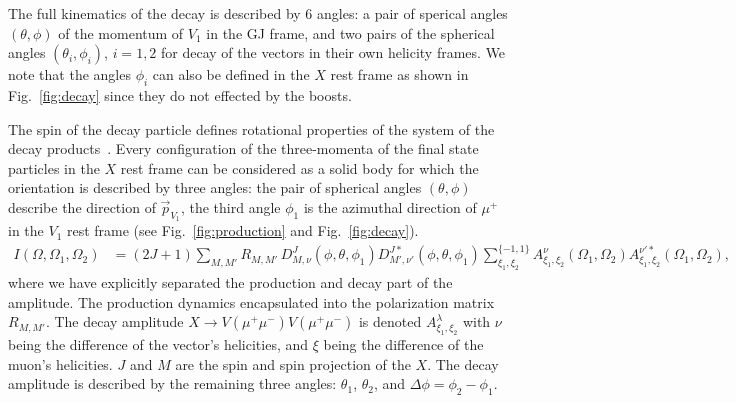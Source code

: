 \documentclass[prd,preprintnumbers,floatfix,
nofootinbib,superscriptaddress]{revtex4}
\newcommand{\diff}{\mathrm{d}}
\begin{document}
The full kinematics of the decay is described by 6 angles: a pair of sperical angles $(\theta,\phi)$ of the momentum of $V_1$ in the GJ frame, and two pairs of the spherical angles $(\theta_i,\phi_i)$, $i=1,2$
for decay of the vectors in their own helicity frames.
We note that the angles $\phi_i$ can also be defined in the $X$ rest frame as shown in Fig.~\ref{fig:decay}
since they do not effected by the boosts.

The spin of the decay particle defines rotational properties of the system of the decay products~\cite{Mikhasenko:2019rjf}.
Every configuration of the three-momenta of the final state particles in the $X$ rest frame
can be considered as a solid body for which the orientation is described by three angles:
the pair of spherical angles $(\theta,\phi)$ describe the direction of $\vec p_{V_1}$,
the third angle $\phi_1$ is the azimuthal direction of $\mu^+$ in the $V_1$ rest frame (see Fig.~\ref{fig:production} and Fig.~\ref{fig:decay}).
%
\begin{align}
    I(\Omega,\Omega_1,\Omega_2) &= (2J+1) \sum_{M,M'}R_{M,M'}\,
    D_{M,\nu}^{J}(\phi,\theta,\phi_1) D_{M',\nu'}^{J*}(\phi,\theta,\phi_1)
    \sum_{\xi_1,\xi_2}^{\{-1,1\}}
    A^{\nu}_{\xi_1,\xi_2}(\Omega_1,\Omega_2) A^{\nu'*}_{\xi_1,\xi_2}(\Omega_1,\Omega_2),
\end{align}
where we have explicitly separated the production and decay part of the amplitude.
The production dynamics encapsulated into the polarization matrix $R_{M,M'}$.
The decay amplitude $X\to V(\mu^+\mu^-)V(\mu^+\mu^-)$ is denoted $A^{\lambda}_{\xi_1,\xi_2}$
with $\nu$ being the difference of the vector's helicities, and $\xi$ being the difference of the muon's helicities. $J$ and $M$ are the spin and spin projection of the $X$.
The decay amplitude is described by the remaining three angles: $\theta_1$, $\theta_2$, and $\Delta\phi = \phi_2-\phi_1$.
\end{document}
